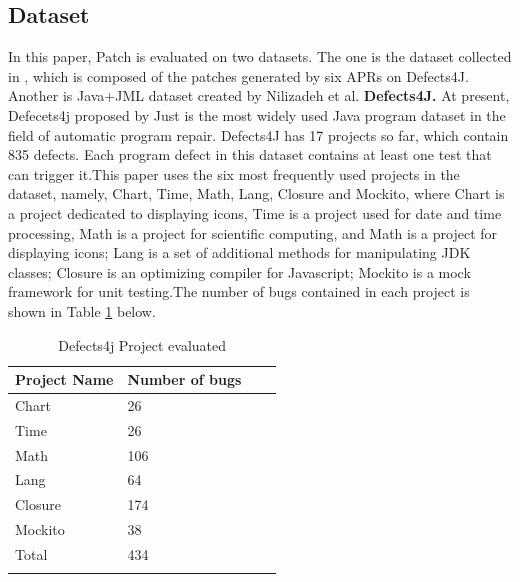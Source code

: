 \documentclass[sn-basic]{sn-jnl}
\theoremstyle{thmstyleone}
\theoremstyle{thmstyletwo}
\theoremstyle{thmstylethree}
\begin{document}
\subsection{Dataset}
In this paper, Patch is evaluated on two datasets. The one is the dataset collected in \citep{bib8}, which is composed of the patches generated by six APRs on Defects4J. Another is Java+JML dataset created by Nilizadeh et al.
\textbf{Defects4J.} At present, Defecets4j proposed by Just\citeyearpar{bib49} is the most widely used Java program dataset in the field of automatic program repair. Defects4J has 17 projects so far, which contain 835 defects. Each program defect in this dataset contains at least one test that can trigger it.This paper uses the six most frequently used projects in the dataset, namely, Chart, Time, Math, Lang, Closure and Mockito, where Chart is a project dedicated to displaying icons, Time is a project used for date and time processing, Math is a project for scientific computing, and Math is a project for displaying icons; Lang is a set of additional methods for manipulating JDK classes; Closure is an optimizing compiler for Javascript; Mockito is a mock framework for unit testing.The number of bugs contained in each project is shown in Table \ref{tab1} below.
\begin{table}[ht]
	\begin{center}
		\begin{minipage}{174pt}
			\caption{Defects4j Project evaluated}\label{tab1}%
			\begin{tabular}{@{}llll@{}}
				\toprule
				Project Name & Number of bugs  \\
				\midrule
				Chart    & 26   \\
				Time    & 26   \\
				Math    & 106     \\
				Lang    & 64     \\
				Closure    & 174     \\
				Mockito    & 38     \\
				Total    & 434     \\
				\botrule
			\end{tabular}
		\end{minipage}
	\end{center}
\end{table}
\end{document}
